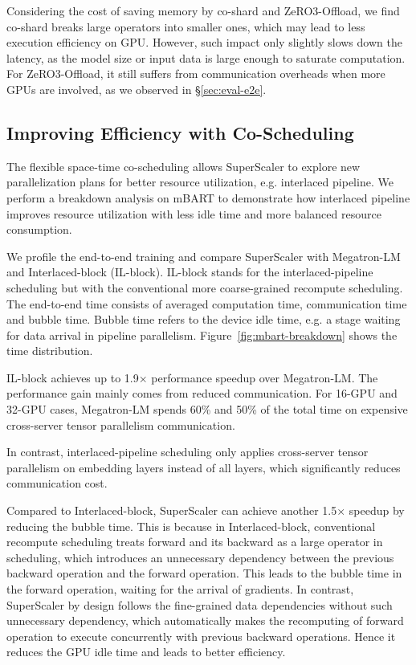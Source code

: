 Considering the cost of saving memory by {co-shard} and ZeRO3-Offload, we find {co-shard} breaks large operators into smaller ones, which may lead to less execution efficiency on GPU. However, such impact only slightly slows down the latency, as the model size or input data is large enough to saturate computation. For ZeRO3-Offload, it still suffers from communication overheads when more GPUs are involved, as we observed in \S \ref{sec:eval-e2e}.

\subsection{Improving Efficiency with Co-Scheduling}
\label{sec:eval-co-schedule}

The flexible space-time co-scheduling allows {SuperScaler} to explore new parallelization plans for better resource utilization, e.g. interlaced pipeline. We perform a breakdown analysis on mBART to demonstrate how interlaced pipeline improves resource utilization with less idle time and more balanced resource consumption.

We profile the end-to-end training and compare {SuperScaler} with Megatron-LM and Interlaced-block (IL-block). IL-block stands for the interlaced-pipeline scheduling but with the conventional more coarse-grained recompute scheduling. The end-to-end time consists of averaged computation time, communication time and bubble time. Bubble time refers to the device idle time, e.g. a stage waiting for data arrival in pipeline parallelism. Figure~\ref{fig:mbart-breakdown} shows the time distribution. 

IL-block achieves up to 1.9$\times$ performance speedup over Megatron-LM. The performance gain mainly comes from reduced communication. For 16-GPU and 32-GPU cases, Megatron-LM spends 60\% and 50\% of the total time on expensive cross-server tensor parallelism communication. 

In contrast, interlaced-pipeline scheduling only applies cross-server tensor parallelism on embedding layers instead of all layers, which significantly reduces communication cost. 

Compared to Interlaced-block, {SuperScaler} can achieve another 1.5$\times$ speedup by reducing the bubble time. This is because in Interlaced-block, conventional recompute scheduling treats forward and its backward as a large operator in scheduling, which introduces an unnecessary dependency between the previous backward operation and the forward operation. This leads to the bubble time in the forward operation, waiting for the arrival of gradients. In contrast, {SuperScaler} by design follows the fine-grained data dependencies without such unnecessary dependency, which automatically makes the recomputing of forward operation to execute concurrently with previous backward operations. Hence it reduces the GPU idle time and leads to better efficiency. 

